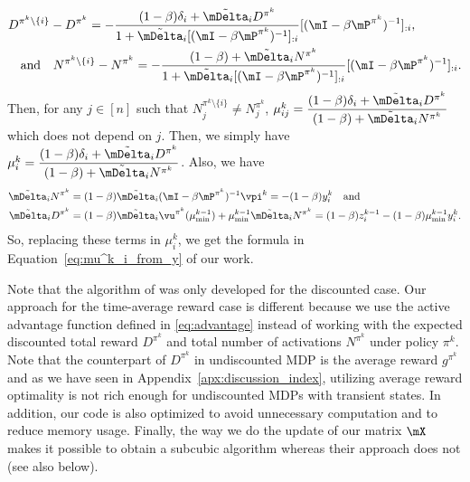 \begin{align*}
    &D^{\pi^k\setminus\{i\}} -D^{\pi^k} = -\frac{(1-\beta)\delta_i +\tilde{\mDelta}_iD^{\pi^k}}{1+\tilde{\mDelta}_i[(\mI-\beta \mP^{\pi^k})^{-1}]_{: i}}[(\mI-\beta \mP^{\pi^k})^{-1}]_{: i}, \\
    &\quad \text{and}\quad N^{\pi^k\setminus\{i\}} -N^{\pi^k} = -\frac{(1-\beta) +\tilde{\mDelta}_iN^{\pi^k}}{1+\tilde{\mDelta}_i[(\mI-\beta \mP^{\pi^k})^{-1}]_{: i}}[(\mI-\beta \mP^{\pi^k})^{-1}]_{: i}.
\end{align*}
Then, for any $j\in[n]$ such that $N_j^{\pi^k\setminus\{i\}}\neq N_j^{\pi^k}$, $\mu^k_{ij}=\displaystyle\frac{(1-\beta)\delta_i +\tilde{\mDelta}_iD^{\pi^k}}{(1-\beta) +\tilde{\mDelta}_iN^{\pi^k}}$ which does not depend on $j$.
Then, we simply have ${\mu^k_i=\displaystyle\frac{(1-\beta)\delta_i +\tilde{\mDelta}_iD^{\pi^k}}{(1-\beta) +\tilde{\mDelta}_iN^{\pi^k}}}$. %
Also, we have 
\begin{align*}
    \tilde{\mDelta}_iN^{\pi^k}&=(1-\beta)\tilde{\mDelta}_i(\mI-\beta \mP^{\pi^k})^{-1}\vpi^k=-(1-\beta)y^k_i \quad\text{and}\\
    \tilde{\mDelta}_iD^{\pi^k}&={(1-\beta)\tilde{\mDelta}_i\vu^{\pi^k}(\mu^{k-1}_{\min}) +\mu^{k-1}_{\min}\tilde{\mDelta}_i N^{\pi^k}} =(1-\beta)z^{k-1}_i -(1-\beta)\mu^{k-1}_{\min}y^k_i.
\end{align*}
So, replacing these terms in $\mu^k_i$, we get the formula in Equation~\eqref{eq:mu^k_i_from_y} of our work.

Note that the algorithm of \cite{akbarzadeh2020conditions} was only developed for the discounted case.  Our approach for the time-average reward case is different because we use the active advantage function defined in \eqref{eq:advantage} instead of working with the expected discounted total reward $D^{\pi^k}$ and total number of activations $N^{\pi^k}$ under policy $\pi^k$. 
Note that the counterpart of $D^{\pi^k}$ in undiscounted MDP is the average reward $g^{\pi^k}$ and as we have seen in Appendix~\ref{apx:discussion_index}, utilizing average reward optimality is not rich enough for undiscounted MDPs with transient states.
In addition, our code is also optimized to avoid unnecessary computation and to reduce memory usage. Finally, the way we do the update of our matrix $\mX$ makes it possible to obtain a subcubic algorithm whereas their approach does not (see also below).

